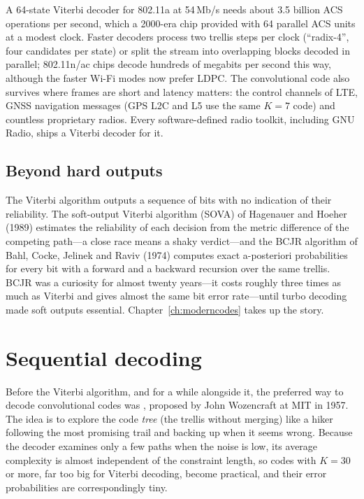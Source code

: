 \begin{inpractice}
A 64-state Viterbi decoder for 802.11a at 54\,Mb/s needs about 3.5 billion ACS operations per second,
which a 2000-era chip provided with 64 parallel ACS units at a modest clock. Faster decoders process two
trellis steps per clock (``radix-4'', four candidates per state) or split the stream into overlapping
blocks decoded in parallel; 802.11n/ac chips decode hundreds of megabits per second this way, although
the faster Wi-Fi modes now prefer LDPC. The convolutional code also survives where frames are short and
latency matters: the control channels of LTE, GNSS navigation messages (GPS L2C and L5 use the same
$K=7$ code) and countless proprietary radios. Every software-defined radio toolkit, including GNU Radio,
ships a Viterbi decoder for it.
\end{inpractice}

\subsection{Beyond hard outputs}

The Viterbi algorithm outputs a sequence of bits with no indication of their reliability. The
soft-output Viterbi algorithm (SOVA) of Hagenauer and Hoeher (1989) estimates the reliability of each
decision from the metric difference of the competing path---a close race means a shaky verdict---and the
BCJR algorithm of Bahl, Cocke, Jelinek and Raviv (1974) computes exact a-posteriori probabilities for
every bit with a forward and a backward recursion over the same trellis. BCJR was a curiosity for almost
twenty years---it costs roughly three times as much as Viterbi and gives almost the same bit error
rate---until turbo decoding made soft outputs essential. Chapter~\ref{ch:moderncodes} takes up the story.

\section{Sequential decoding}
\label{sec:ch14:sequential}

Before the Viterbi algorithm, and for a while alongside it, the preferred way to decode convolutional
codes was , proposed by John Wozencraft at MIT in 1957. The idea is to
explore the code \emph{tree} (the trellis without merging) like a hiker following the most promising trail
and backing up when it seems wrong. Because the decoder examines only a few paths when the noise is low,
its average complexity is almost independent of the constraint length, so codes with $K=30$ or more,
far too big for Viterbi decoding, become practical, and their error probabilities are correspondingly tiny.

